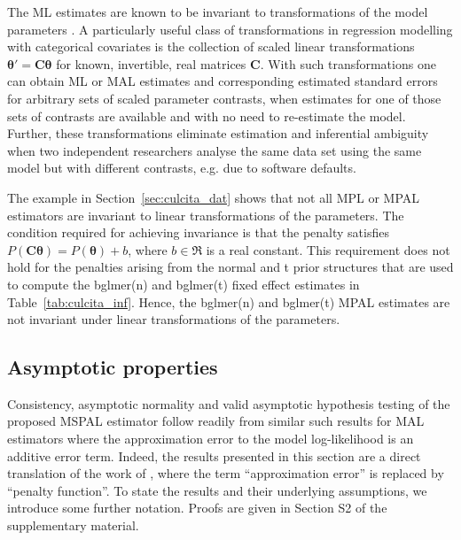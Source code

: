 \documentclass[11pt, a4paper]{article}
\newcommand*{\bb}{\boldsymbol}
\theoremstyle{example} \newtheorem{example}{Example}[section]
\theoremstyle{theorem} \newtheorem{theorem}{Theorem}[section]
\def\btheta{\bb{\theta}}
\def\bC{\bb{C}}
\begin{document}
The ML estimates are known to be invariant to transformations of the
model parameters \citep[see, for example][]{zehna:1966}. A
particularly useful class of transformations in regression modelling
with categorical covariates is the collection of scaled linear transformations
$\btheta' = \bC \btheta$ for known, invertible, real matrices
$\bC$. With such transformations one can obtain ML or MAL estimates and corresponding
estimated standard errors for arbitrary sets of scaled parameter
contrasts, when estimates for one of those sets of contrasts are
available and with no need to re-estimate the model. Further, these transformations eliminate estimation and
inferential ambiguity when two independent researchers analyse the
same data set using the same model but with different contrasts,
e.g. due to software defaults.

The example in Section~\ref{sec:culcita_dat} shows that not all MPL or
MPAL estimators are invariant to linear transformations of the
parameters. The condition required for achieving invariance is that
the penalty satisfies $P(\bC\btheta) = P(\btheta) + b$, where
$b \in \Re$ is a real constant. This requirement does not hold for
the penalties arising from the normal and t prior structures that are
used to compute the bglmer(n) and bglmer(t) fixed effect estimates in Table~\ref{tab:culcita_inf}. Hence, the bglmer(n) and
bglmer(t) MPAL estimates are not invariant under linear
transformations of the parameters.

\subsection{Asymptotic properties}
\label{sec:ass+res}

Consistency, asymptotic normality and valid asymptotic hypothesis testing of the proposed MSPAL estimator follow readily from similar such results for MAL estimators where the approximation error to the model log-likelihood is an additive error term. Indeed, the results presented in this section are a direct translation of the work of \citet{ogden2017asymptotic}, where the term ``approximation error'' is replaced by ``penalty function''. To state the results and their underlying assumptions, we introduce some further notation. Proofs are given in Section S2 of the supplementary material.
\end{document}
